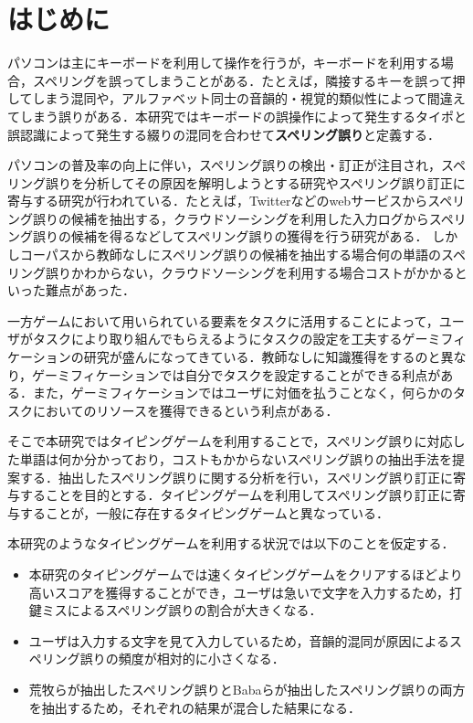 \chapter{はじめに}
パソコンは主にキーボードを利用して操作を行うが，キーボードを利用する場合，スペリングを誤ってしまうことがある．たとえば，隣接するキーを誤って押してしまう混同や，アルファベット同士の音韻的・視覚的類似性によって間違えてしまう誤りがある．本研究ではキーボードの誤操作によって発生するタイポと誤認識によって発生する綴りの混同を合わせて\textbf{スペリング誤り}と定義する．

パソコンの普及率の向上に伴い，スペリング誤りの検出・訂正が注目され，スペリング誤りを分析してその原因を解明しようとする研究やスペリング誤り訂正に寄与する研究が行われている．たとえば，Twitterなどのwebサービスからスペリング誤りの候補を抽出する\cite{aramakiNLP2010}，クラウドソーシングを利用した入力ログからスペリング誤りの候補を得る\cite{babaACL2012}などしてスペリング誤りの獲得を行う研究がある．
しかしコーパスから教師なしにスペリング誤りの候補を抽出する場合何の単語のスペリング誤りかわからない，クラウドソーシングを利用する場合コストがかかるといった難点があった．

一方ゲームにおいて用いられている要素をタスクに活用することによって，ユーザがタスクにより取り組んでもらえるようにタスクの設定を工夫するゲーミフィケーションの研究が盛んになってきている\cite{deterdingACM2011}．教師なしに知識獲得をするのと異なり，ゲーミフィケーションでは自分でタスクを設定することができる利点がある．また，ゲーミフィケーションではユーザに対価を払うことなく，何らかのタスクにおいてのリソースを獲得できるという利点がある．

そこで本研究ではタイピングゲームを利用することで，スペリング誤りに対応した単語は何か分かっており，コストもかからないスペリング誤りの抽出手法を提案する．抽出したスペリング誤りに関する分析を行い，スペリング誤り訂正に寄与することを目的とする．タイピングゲームを利用してスペリング誤り訂正に寄与することが，一般に存在するタイピングゲームと異なっている．

本研究のようなタイピングゲームを利用する状況では以下のことを仮定する．

\begin{itemize}
 \item 本研究のタイピングゲームでは速くタイピングゲームをクリアするほどより高いスコアを獲得することができ，ユーザは急いで文字を入力するため，打鍵ミスによるスペリング誤りの割合が大きくなる．
 \item ユーザは入力する文字を見て入力しているため，音韻的混同が原因によるスペリング誤りの頻度が相対的に小さくなる．
 \item 荒牧らが抽出したスペリング誤り\cite{aramakiNLP2010}とBabaらが抽出したスペリング誤り\cite{babaACL2012}の両方を抽出するため，それぞれの結果が混合した結果になる．
\end{itemize}

